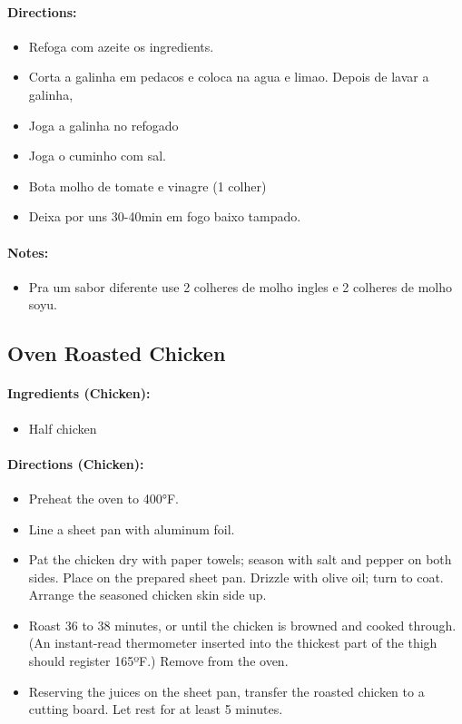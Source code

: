 \documentclass{article}
\begin{document}
\paragraph{Directions:}
\begin{itemize}
	\item Refoga com azeite os ingredients.
	\item Corta a galinha em pedacos e coloca na agua e limao. Depois de lavar a galinha,
	\item Joga a galinha no refogado
	\item Joga o cuminho com sal.
	\item Bota molho de tomate e vinagre (1 colher)
	\item Deixa por uns 30-40min em fogo baixo tampado.
\end{itemize}

\paragraph{Notes:}
\begin{itemize}
	\item Pra um sabor diferente use 2 colheres de molho ingles e 2 colheres de molho soyu.
\end{itemize}

\subsection{Oven Roasted Chicken}

\paragraph{Ingredients (Chicken):}
\begin{itemize}
	\item Half chicken
\end{itemize}

\paragraph{Directions (Chicken):}
\begin{itemize}
	\item Preheat the oven to 400°F. 
	\item Line a sheet pan with aluminum foil. 
	\item Pat the chicken dry with paper towels; season with salt and pepper on both sides. Place on the prepared sheet pan. Drizzle with olive oil; turn to coat. Arrange the seasoned chicken skin side up. 
	\item Roast 36 to 38 minutes, or until the chicken is browned and cooked through. (An instant-read thermometer inserted into the thickest part of the thigh should register 165ºF.) Remove from the oven. 
	\item Reserving the juices on the sheet pan, transfer the roasted chicken to a cutting board. Let rest for at least 5 minutes.
\end{itemize}
\end{document}
